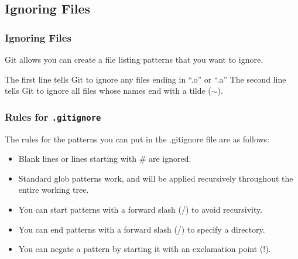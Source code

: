 
\subsection{Ignoring Files}
\begin{frame}
  \frametitle{Ignoring Files}

  Git allows you can create a file listing patterns that you want to ignore.
  \vspace{2em}

  \gitignore

  The first line tells Git to ignore any files ending in “.o” or “.a”
  The second line tells Git to ignore all files whose names end with a tilde ($\sim$).
\end{frame}


\begin{frame}
  \frametitle{Rules for \texttt{.gitignore}}

  The rules for the patterns you can put in the .gitignore file are as follows:
  \begin{itemize}
    \item Blank lines or lines starting with \# are ignored.
    \item Standard glob patterns work, and will be applied recursively throughout the entire working tree.
    \item You can start patterns with a forward slash (/) to avoid recursivity.
    \item You can end patterns with a forward slash (/) to specify a directory.
    \item You can negate a pattern by starting it with an exclamation point (!).
  \end{itemize}
\end{frame}


